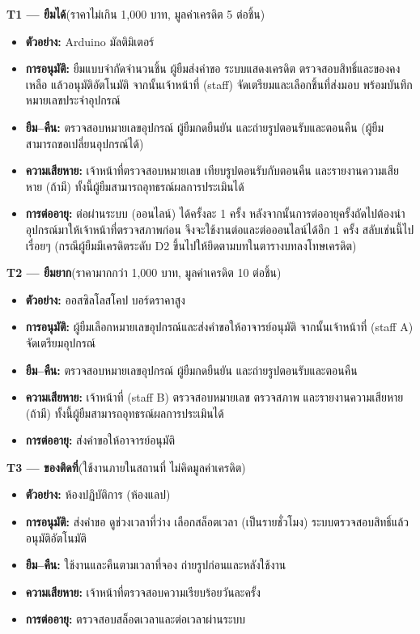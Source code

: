 \noindent\textbf{T1 — ยืมได้}\quad(ราคาไม่เกิน 1,000 บาท, มูลค่าเครดิต 5 ต่อชิ้น)
\begin{itemize}
  \item \textbf{ตัวอย่าง:} Arduino มัลติมิเตอร์
  \item \textbf{การอนุมัติ:} ยืมแบบจำกัดจำนวนชิ้น ผู้ยืมส่งคำขอ ระบบแสดงเครดิต ตรวจสอบสิทธิ์และของคงเหลือ แล้วอนุมัติอัตโนมัติ จากนั้นเจ้าหน้าที่ (staff) จัดเตรียมและเลือกชิ้นที่ส่งมอบ พร้อมบันทึกหมายเลขประจำอุปกรณ์
  \item \textbf{ยืม–คืน:} ตรวจสอบหมายเลขอุปกรณ์ ผู้ยืมกดยืนยัน และถ่ายรูปตอนรับและตอนคืน (ผู้ยืมสามารถขอเปลี่ยนอุปกรณ์ได้)
  \item \textbf{ความเสียหาย:} เจ้าหน้าที่ตรวจสอบหมายเลข เทียบรูปตอนรับกับตอนคืน และรายงานความเสียหาย (ถ้ามี) ทั้งนี้ผู้ยืมสามารถอุทธรณ์ผลการประเมินได้
  \item \textbf{การต่ออายุ:} ต่อผ่านระบบ (ออนไลน์) ได้ครั้งละ 1 ครั้ง หลังจากนั้นการต่ออายุครั้งถัดไปต้องนำอุปกรณ์มาให้เจ้าหน้าที่ตรวจสภาพก่อน จึงจะใช้งานต่อและต่อออนไลน์ได้อีก 1 ครั้ง สลับเช่นนี้ไปเรื่อยๆ (กรณีผู้ยืมมีเครดิตระดับ D2 ขึ้นไปให้ยึดตามบทในตารางบทลงโทษเครดิต)
\end{itemize}

\noindent\textbf{T2 — ยืมยาก}\quad(ราคามากกว่า 1,000 บาท, มูลค่าเครดิต 10 ต่อชิ้น)
\begin{itemize}
  \item \textbf{ตัวอย่าง:} ออสซิลโลสโคป บอร์ดราคาสูง
  \item \textbf{การอนุมัติ:} ผู้ยืมเลือกหมายเลขอุปกรณ์และส่งคำขอให้อาจารย์อนุมัติ จากนั้นเจ้าหน้าที่ (staff A) จัดเตรียมอุปกรณ์
  \item \textbf{ยืม–คืน:} ตรวจสอบหมายเลขอุปกรณ์ ผู้ยืมกดยืนยัน และถ่ายรูปตอนรับและตอนคืน
  \item \textbf{ความเสียหาย:} เจ้าหน้าที่ (staff B) ตรวจสอบหมายเลข ตรวจสภาพ และรายงานความเสียหาย (ถ้ามี) ทั้งนี้ผู้ยืมสามารถอุทธรณ์ผลการประเมินได้
  \item \textbf{การต่ออายุ:} ส่งคำขอให้อาจารย์อนุมัติ
\end{itemize}

\noindent\textbf{T3 — ของติดที่}\quad(ใช้งานภายในสถานที่ ไม่คิดมูลค่าเครดิต)
\begin{itemize}
  \item \textbf{ตัวอย่าง:} ห้องปฏิบัติการ (ห้องแลป)
  \item \textbf{การอนุมัติ:} ส่งคำขอ ดูช่วงเวลาที่ว่าง เลือกสล็อตเวลา (เป็นรายชั่วโมง) ระบบตรวจสอบสิทธิ์แล้วอนุมัติอัตโนมัติ
  \item \textbf{ยืม–คืน:} ใช้งานและคืนตามเวลาที่จอง ถ่ายรูปก่อนและหลังใช้งาน
  \item \textbf{ความเสียหาย:} เจ้าหน้าที่ตรวจสอบความเรียบร้อยวันละครั้ง
  \item \textbf{การต่ออายุ:} ตรวจสอบสล็อตเวลาและต่อเวลาผ่านระบบ
\end{itemize}

